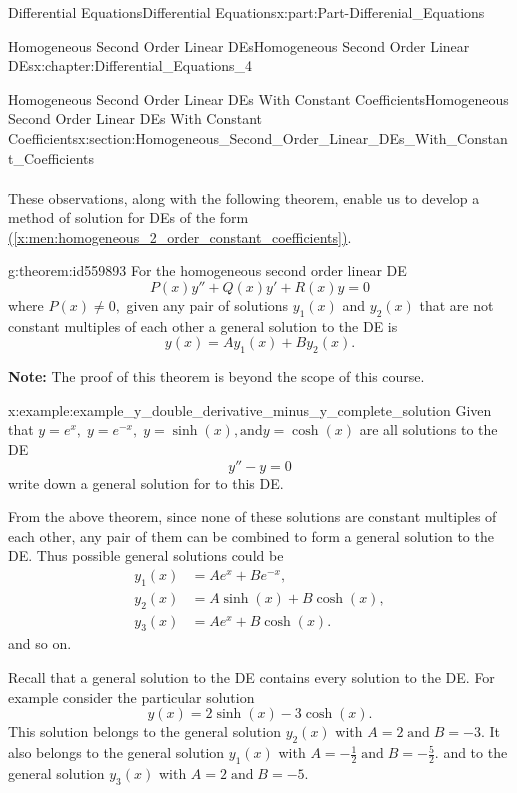 \documentclass[oneside,10pt,]{book}
\newcommand{\xreffont}{\relax}
\newcommand{\terminology}[1]{\textbf{#1}}
\numberwithin{equation}{section}
\newcommand{\amp}{&}
\begin{document}
\begin{partptx}{Differential Equations}{}{Differential Equations}{}{}{x:part:Part-Differenial_Equations}
\begin{chapterptx}{Homogeneous Second Order Linear DEs}{}{Homogeneous Second Order Linear DEs}{}{}{x:chapter:Differential_Equations_4}
\begin{sectionptx}{Homogeneous Second Order Linear DEs With Constant Coefficients}{}{Homogeneous Second Order Linear DEs With Constant Coefficients}{}{}{x:section:Homogeneous_Second_Order_Linear_DEs_With_Constant_Coefficients}
\begin{align*}
\end{align*}
%
\par
These observations, along with the following theorem, enable us to develop a method of solution for DEs of the form \hyperref[x:men:homogeneous_2_order_constant_coefficients]{({\xreffont\ref{x:men:homogeneous_2_order_constant_coefficients}})}.%
\begin{theorem}{}{}{g:theorem:id559893}%
For the homogeneous second order linear DE%
\begin{equation*}
P(x)y''+Q(x)y'+R(x)y=0 
\end{equation*}
where \(P(x)\neq 0, \) given any pair of solutions    \(y_{1}(x) \)  and \(y_{2}(x) \)    that are not constant multiples of each other a general solution to the DE is%
\begin{equation*}
y(x) =  A y_{1}(x) + B y_{2}(x). 
\end{equation*}
%
\end{theorem}
\terminology{Note:} The proof of this theorem is beyond the scope of this course.%
\begin{example}{}{x:example:example_y_double_derivative_minus_y_complete_solution}%
Given that \(y=e^{x},\; y=e^{-x}, \; y=\sinh(x), \text{and} y=\cosh(x) \) are all solutions to the DE%
\begin{equation*}
y''-y=0
\end{equation*}
write down a general solution for to this DE.%
\par
From the above theorem, since none of these solutions are constant multiples of each other, any pair of them can be combined to form a general solution to the DE. Thus possible general solutions could be%
\begin{align*}
y_{1}(x) \amp =  A e^{x} + B e^{-x},  \\
y_{2}(x) \amp =  A \sinh(x) + B \cosh(x),    \\
y_{3}(x) \amp =  A e^{x} + B \cosh(x).   
\end{align*}
and so on.%
\par
Recall that a general solution to the DE contains every solution to the DE. For example consider the particular solution%
\begin{equation*}
y(x) =  2 \sinh(x) - 3 \cosh(x).
\end{equation*}
This solution belongs to the general solution \(y_{2}(x) \)  with \(A=2 \; \text{and}\; B=-3.   \) It  also belongs to the general solution \(y_{1}(x) \)  with \(A=-\frac{1}{2} \; \text{and}\; B=-\frac{5}{2}.   \) and to the general solution \(y_{3}(x) \)  with \(A=2 \; \text{and}\; B=-5.  \)%

\end{example}
\end{sectionptx}
\end{chapterptx}
\end{partptx}
\end{document}
